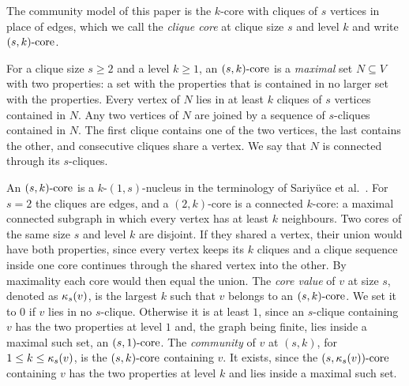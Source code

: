 The community model of this paper is the $k$-core with cliques of $s$ vertices in place of edges, which we call the \textit{clique core} at clique size $s$ and level $k$ and write $(s,k)\text{-core}$.
\begin{definition}[$(s,k)$-core]\label{def:nucleus}
For a clique size $s\ge2$ and a level $k\ge1$, an $(s,k)\text{-core}$ is a \textit{maximal} set $N\subseteq V$ with two properties: a set with the properties that is contained in no larger set with the properties.
%
Every vertex of $N$ lies in at least $k$ cliques of $s$ vertices contained in $N$.
%
Any two vertices of $N$ are joined by a sequence of $s$-cliques contained in $N$.
%
The first clique contains one of the two vertices, the last contains the other, and consecutive cliques share a vertex.
%
We say that $N$ is connected through its $s$-cliques.
\end{definition}
An $(s,k)\text{-core}$ is a $k$-$(1,s)$-nucleus in the terminology of Sariy\"uce et al.~\cite{firstNucleus}.
%
For $s=2$ the cliques are edges, and a $(2,k)$-core is a connected $k$-core: a maximal connected subgraph in which every vertex has at least $k$ neighbours.
%
Two cores of the same size $s$ and level $k$ are disjoint.
%
If they shared a vertex, their union would have both properties, since every vertex keeps its $k$ cliques and a clique sequence inside one core continues through the shared vertex into the other.
%
By maximality each core would then equal the union.
%
The \textit{core value} of $v$ at size $s$, denoted as $\kappa_{s}(v)$, is the largest $k$ such that $v$ belongs to an $(s,k)\text{-core}$.
%
We set it to $0$ if $v$ lies in no $s$-clique.
%
Otherwise it is at least $1$, since an $s$-clique containing $v$ has the two properties at level $1$ and, the graph being finite, lies inside a maximal such set, an $(s,1)\text{-core}$.
%
The \textit{community} of $v$ at $(s,k)$, for $1\le k\le\kappa_{s}(v)$, is the $(s,k)\text{-core}$ containing $v$.
%
It exists, since the $(s,\kappa_{s}(v))\text{-core}$ containing $v$ has the two properties at level $k$ and lies inside a maximal such set.
